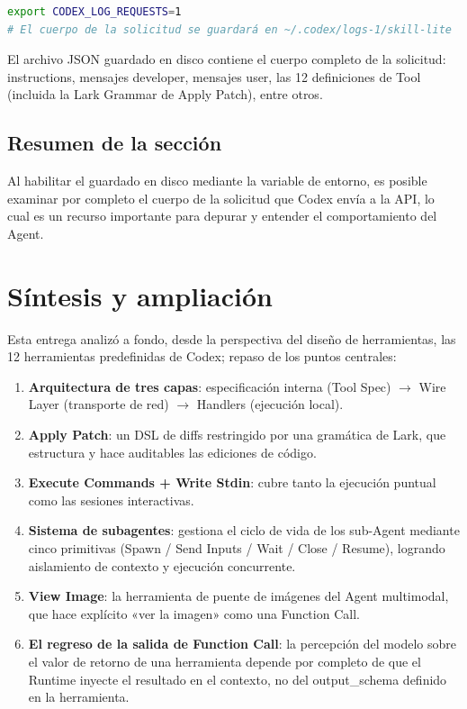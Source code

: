 \documentclass[a4paper]{article}
\begin{document}
\begin{lstlisting}[caption={Variable de entorno para habilitar el guardado en disco del cuerpo de la solicitud}, language=bash]
export CODEX_LOG_REQUESTS=1
# El cuerpo de la solicitud se guardará en ~/.codex/logs-1/skill-lite
\end{lstlisting}

El archivo JSON guardado en disco contiene el cuerpo completo de la solicitud: instructions, mensajes developer, mensajes user, las 12 definiciones de Tool (incluida la Lark Grammar de Apply Patch), entre otros.

\subsection{Resumen de la sección}

Al habilitar el guardado en disco mediante la variable de entorno, es posible examinar por completo el cuerpo de la solicitud que Codex envía a la API, lo cual es un recurso importante para depurar y entender el comportamiento del Agent.

\section{Síntesis y ampliación}

Esta entrega analizó a fondo, desde la perspectiva del diseño de herramientas, las 12 herramientas predefinidas de Codex; repaso de los puntos centrales:

\begin{enumerate}
    \item \textbf{Arquitectura de tres capas}: especificación interna (Tool Spec) $\rightarrow$ Wire Layer (transporte de red) $\rightarrow$ Handlers (ejecución local).
    \item \textbf{Apply Patch}: un DSL de diffs restringido por una gramática de Lark, que estructura y hace auditables las ediciones de código.
    \item \textbf{Execute Commands + Write Stdin}: cubre tanto la ejecución puntual como las sesiones interactivas.
    \item \textbf{Sistema de subagentes}: gestiona el ciclo de vida de los sub-Agent mediante cinco primitivas (Spawn / Send Inputs / Wait / Close / Resume), logrando aislamiento de contexto y ejecución concurrente.
    \item \textbf{View Image}: la herramienta de puente de imágenes del Agent multimodal, que hace explícito «ver la imagen» como una Function Call.
    \item \textbf{El regreso de la salida de Function Call}: la percepción del modelo sobre el valor de retorno de una herramienta depende por completo de que el Runtime inyecte el resultado en el contexto, no del output\_schema definido en la herramienta.
\end{enumerate}
\end{document}
